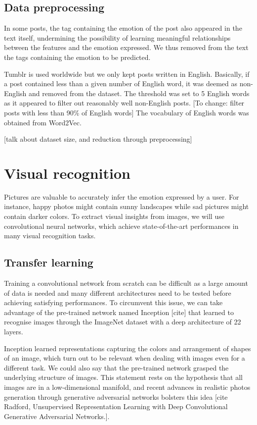 \documentclass{article} %
\begin{document}
\subsection{Data preprocessing}
In some posts, the tag containing the emotion of the post also appeared in the text itself, undermining the possibility of learning meaningful relationships between the features and the emotion expressed. We thus removed from the text the tags containing the emotion to be predicted.

Tumblr is used worldwide but we only kept posts written in English. Basically, if a post contained less than a given number of English word, it was deemed as non-English and removed from the dataset. The threshold was set to 5 English words as it appeared to filter out reasonably well non-English posts. [To change: filter posts with less than 90\% of English words] The vocabulary of English words was obtained from Word2Vec.

[talk about dataset size, and reduction through preprocessing]

\section{Visual recognition}
Pictures are valuable to accurately infer the emotion expressed by a user. For instance, happy photos might contain sunny landscapes while sad pictures might contain darker colors. To extract visual insights from images, we will use convolutional neural networks, which achieve state-of-the-art performances in many visual recognition tasks.

\subsection{Transfer learning}
Training a convolutional network from scratch can be difficult as a large amount of data is needed and many different architectures need to be tested before achieving satisfying performances. To circumvent this issue, we can take advantage of the pre-trained network named Inception [cite] that learned to recognise images through the ImageNet dataset with a deep architecture of 22 layers.

Inception learned representations capturing the colors and arrangement of shapes of an image, which turn out to be relevant when dealing with images even for a different task. We could also say that the pre-trained network grasped the underlying structure of images. This statement rests on the hypothesis that all images are in a low-dimensional manifold, and recent advances in realistic photos generation through generative adversarial networks bolsters this idea [cite Radford, Unsupervised Representation Learning with Deep Convolutional Generative Adversarial Networks.]. 
\end{document}
